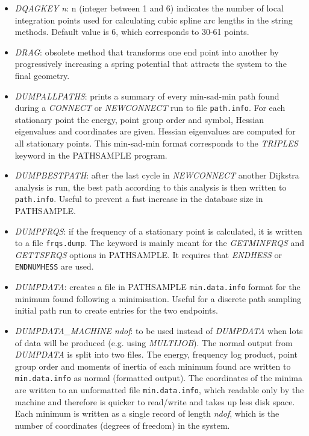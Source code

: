 \documentclass[12pt,a4paper,dvips]{article}
\begin{document}
\begin{itemize}
\item {\it DQAGKEY n}: n (integer between 1 and 6) indicates the number of local 
integration points used for calculating cubic spline arc lengths in the string methods. 
Default value is 6, which corresponds to 30-61 points. 

\item {\it DRAG\/}: obsolete method that transforms one end point into another
by progressively increasing a spring potential that attracts the system to the
final geometry.

\item {\it DUMPALLPATHS\/}: prints a summary of every min-sad-min path 
found during a {\it CONNECT} or {\it NEWCONNECT\/} run to
file {\tt path.info}. For each stationary point the energy, point group order and symbol, 
Hessian eigenvalues and coordinates are given. Hessian eigenvalues are computed
for all stationary points. This min-sad-min format corresponds to the {\it TRIPLES\/}
keyword in the PATHSAMPLE program.

\item {\it DUMPBESTPATH\/}: after the last cycle in {\it NEWCONNECT\/} another Dijkstra analysis is run,
the best path according to this analysis is then written to {\tt path.info}. Useful to prevent a
fast increase in the database size in PATHSAMPLE.

\item {\it DUMPFRQS\/}: if the frequency of a stationary point is calculated, it is written to a file
{\tt frqs.dump}. The keyword is mainly meant for the {\it GETMINFRQS} and {\it GETTSFRQS} options in PATHSAMPLE. It requires
that {\it ENDHESS} or {\tt ENDNUMHESS} are used.

\item {\it DUMPDATA\/}: creates a file in PATHSAMPLE {\tt min.data.info} format for the minimum found
following a minimisation. Useful for a discrete path sampling initial path run to
create entries for the two endpoints.

\item {\it DUMPDATA\_MACHINE ndof\/}: to be used instead of {\it DUMPDATA} when lots of data will be produced (e.g. using {\it MULTIJOB}). The normal output from {\it DUMPDATA} is split into two files. The energy, frequency log product, point group order and moments of inertia of each minimum found are written to {\tt min.data.info} as normal (formatted output). The coordinates of the minima are written to an unformatted file {\tt min.data.info}, which readable only by the machine and therefore is quicker to read/write and takes up less disk space. Each minimum is written as a single record of length {\it ndof}, which is the number of coordinates (degrees of freedom) in the system.


\end{itemize}
\end{document}
